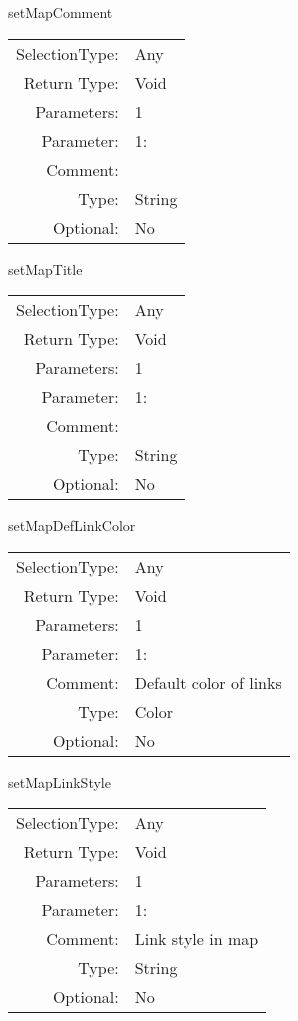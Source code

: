 \item setMapComment\\
\begin{tabular}{rl}
  SelectionType: & Any\\
    Return Type: & Void\\
     Parameters: & 1\\
   Parameter: &  1:\\
        Comment: & \\
           Type: & String\\
       Optional: &  No\\
\end{tabular}

\item setMapTitle\\
\begin{tabular}{rl}
  SelectionType: & Any\\
    Return Type: & Void\\
     Parameters: & 1\\
   Parameter: &  1:\\
        Comment: & \\
           Type: & String\\
       Optional: &  No\\
\end{tabular}

\item setMapDefLinkColor\\
\begin{tabular}{rl}
  SelectionType: & Any\\
    Return Type: & Void\\
     Parameters: & 1\\
   Parameter: &  1:\\
        Comment: & Default color of links\\
           Type: & Color\\
       Optional: &  No\\
\end{tabular}

\item setMapLinkStyle\\
\begin{tabular}{rl}
  SelectionType: & Any\\
    Return Type: & Void\\
     Parameters: & 1\\
   Parameter: &  1:\\
        Comment: & Link style in map\\
           Type: & String\\
       Optional: &  No\\
\end{tabular}

